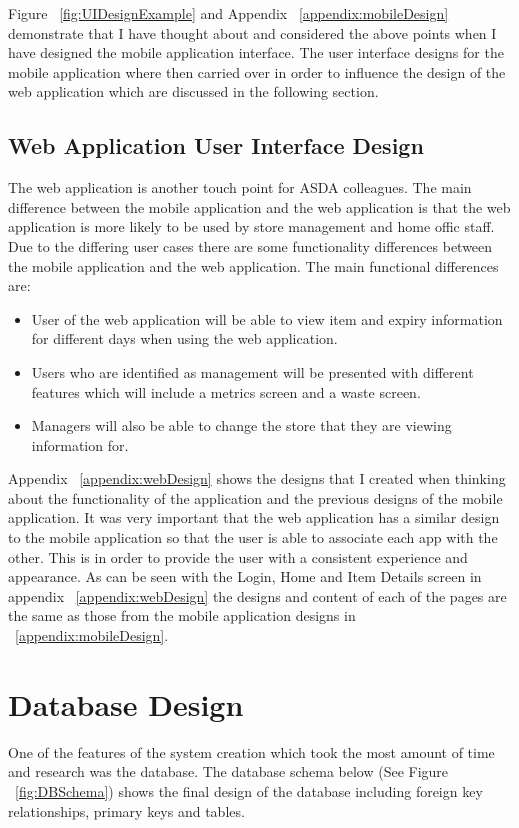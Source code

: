 \documentclass[a4paper,11pt]{report}
\begin{document}
Figure ~\ref{fig:UIDesignExample} and Appendix ~\ref{appendix:mobileDesign} demonstrate that I have thought about and considered the above points when I have designed the mobile application interface. The user interface designs for the mobile application where then carried over in order to influence the design of the web application which are discussed in the following section.

\subsection{Web Application User Interface Design}

The web application is another touch point for ASDA colleagues. The main difference between the mobile application and the web application is that the web application is more likely to be used by store management and home offic staff. Due to the differing user cases there are some functionality differences between the mobile application and the web application. The main functional differences are:
\begin{itemize}
    \item User of the web application will be able to view item and expiry information for different days when using the web application.
    \item Users who are identified as management will be presented with different features which will include a metrics screen and a waste screen.
    \item Managers will also be able to change the store that they are viewing information for. 
\end{itemize}

Appendix ~\ref{appendix:webDesign} shows the designs that I created when thinking about the functionality of the application and the previous designs of the mobile application. 
It was very important that the web application has a similar design to the mobile application so that the user is able to associate each app with the other. This is in order to provide the user with a consistent experience and appearance. As can be seen with the Login, Home and Item Details screen in appendix ~\ref{appendix:webDesign} the designs and content of each of the pages are the same as those from the mobile application designs in ~\ref{appendix:mobileDesign}.

\section{Database Design}
One of the features of the system creation which took the most amount of time and research was the database.
The database schema below (See Figure ~\ref{fig:DBSchema}) shows the final design of the database including foreign key relationships, primary keys and tables.
\end{document}
